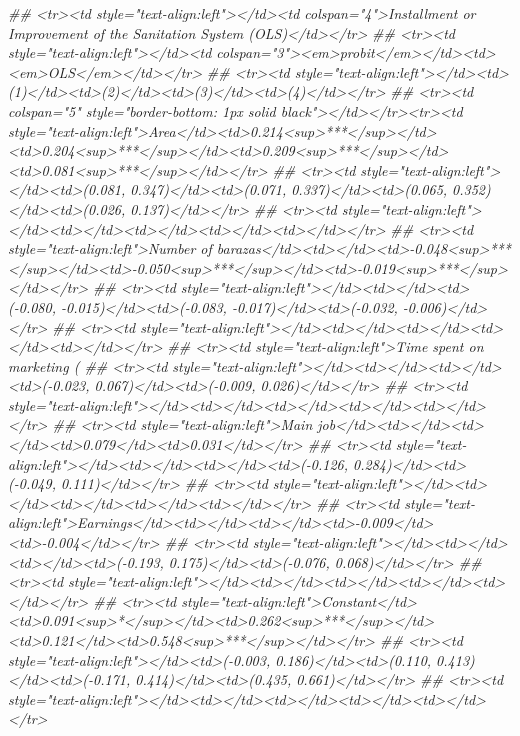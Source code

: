 \documentclass[
]{article}
\newenvironment{Shaded}{\begin{snugshade}}{\end{snugshade}}
\newcommand{\CommentTok}[1]{\textcolor[rgb]{0.56,0.35,0.01}{\textit{#1}}}
\begin{document}
\begin{Shaded}
\begin{Highlighting}[]
{{{{{{{{{{{\CommentTok{## <tr><td style="text-align:left"></td><td colspan="4">Installment or Improvement of the Sanitation System (OLS)</td></tr>}
\CommentTok{## <tr><td style="text-align:left"></td><td colspan="3"><em>probit</em></td><td><em>OLS</em></td></tr>}
\CommentTok{## <tr><td style="text-align:left"></td><td>(1)</td><td>(2)</td><td>(3)</td><td>(4)</td></tr>}
\CommentTok{## <tr><td colspan="5" style="border-bottom: 1px solid black"></td></tr><tr><td style="text-align:left">Area</td><td>0.214<sup>***</sup></td><td>0.204<sup>***</sup></td><td>0.209<sup>***</sup></td><td>0.081<sup>***</sup></td></tr>}
\CommentTok{## <tr><td style="text-align:left"></td><td>(0.081, 0.347)</td><td>(0.071, 0.337)</td><td>(0.065, 0.352)</td><td>(0.026, 0.137)</td></tr>}
\CommentTok{## <tr><td style="text-align:left"></td><td></td><td></td><td></td><td></td></tr>}
\CommentTok{## <tr><td style="text-align:left">Number of barazas</td><td></td><td>-0.048<sup>***</sup></td><td>-0.050<sup>***</sup></td><td>-0.019<sup>***</sup></td></tr>}
\CommentTok{## <tr><td style="text-align:left"></td><td></td><td>(-0.080, -0.015)</td><td>(-0.083, -0.017)</td><td>(-0.032, -0.006)</td></tr>}
\CommentTok{## <tr><td style="text-align:left"></td><td></td><td></td><td></td><td></td></tr>}
\CommentTok{## <tr><td style="text-align:left">Time spent on marketing (%)</td><td></td><td></td><td>0.022</td><td>0.009</td></tr>}
\CommentTok{## <tr><td style="text-align:left"></td><td></td><td></td><td>(-0.023, 0.067)</td><td>(-0.009, 0.026)</td></tr>}
\CommentTok{## <tr><td style="text-align:left"></td><td></td><td></td><td></td><td></td></tr>}
\CommentTok{## <tr><td style="text-align:left">Main job</td><td></td><td></td><td>0.079</td><td>0.031</td></tr>}
\CommentTok{## <tr><td style="text-align:left"></td><td></td><td></td><td>(-0.126, 0.284)</td><td>(-0.049, 0.111)</td></tr>}
\CommentTok{## <tr><td style="text-align:left"></td><td></td><td></td><td></td><td></td></tr>}
\CommentTok{## <tr><td style="text-align:left">Earnings</td><td></td><td></td><td>-0.009</td><td>-0.004</td></tr>}
\CommentTok{## <tr><td style="text-align:left"></td><td></td><td></td><td>(-0.193, 0.175)</td><td>(-0.076, 0.068)</td></tr>}
\CommentTok{## <tr><td style="text-align:left"></td><td></td><td></td><td></td><td></td></tr>}
\CommentTok{## <tr><td style="text-align:left">Constant</td><td>0.091<sup>*</sup></td><td>0.262<sup>***</sup></td><td>0.121</td><td>0.548<sup>***</sup></td></tr>}
\CommentTok{## <tr><td style="text-align:left"></td><td>(-0.003, 0.186)</td><td>(0.110, 0.413)</td><td>(-0.171, 0.414)</td><td>(0.435, 0.661)</td></tr>}
\CommentTok{## <tr><td style="text-align:left"></td><td></td><td></td><td></td><td></td></tr>}
}}}}}}}}}}}}
\end{Highlighting}
\end{Shaded}
\end{document}
